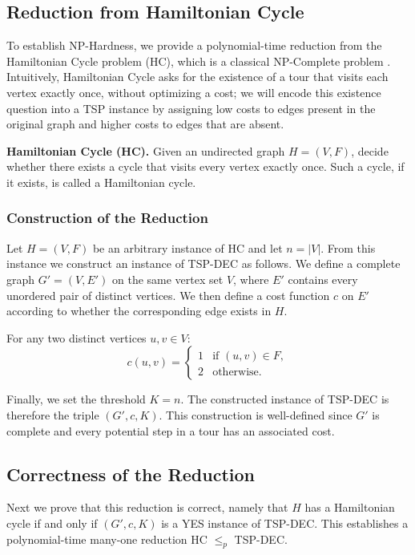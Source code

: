 \subsection{Reduction from Hamiltonian Cycle}

To establish NP-Hardness, we provide a polynomial-time reduction from the Hamiltonian Cycle problem (HC), which is a classical NP-Complete problem \cite{karp1972,garey1979}. Intuitively, Hamiltonian Cycle asks for the existence of a tour that visits each vertex exactly once, without optimizing a cost; we will encode this existence question into a TSP instance by assigning low costs to edges present in the original graph and higher costs to edges that are absent.

\textbf{Hamiltonian Cycle (HC).} Given an undirected graph $H = (V, F)$, decide whether there exists a cycle that visits every vertex exactly once. Such a cycle, if it exists, is called a Hamiltonian cycle.

\subsubsection{Construction of the Reduction}

Let $H = (V, F)$ be an arbitrary instance of HC and let $n = |V|$. From this instance we construct an instance of TSP-DEC as follows. We define a complete graph $G' = (V, E')$ on the same vertex set $V$, where $E'$ contains every unordered pair of distinct vertices. We then define a cost function $c$ on $E'$ according to whether the corresponding edge exists in $H$.

For any two distinct vertices $u, v \in V$:
\[
c(u, v) = \begin{cases}
1 & \text{if } (u, v) \in F, \\
2 & \text{otherwise.}
\end{cases}
\]

Finally, we set the threshold $K = n$. The constructed instance of TSP-DEC is therefore the triple $(G', c, K)$. This construction is well-defined since $G'$ is complete and every potential step in a tour has an associated cost.

\subsection{Correctness of the Reduction}

Next we prove that this reduction is correct, namely that $H$ has a Hamiltonian cycle if and only if $(G', c, K)$ is a YES instance of TSP-DEC. This establishes a polynomial-time many-one reduction HC $\le_p$ TSP-DEC.

